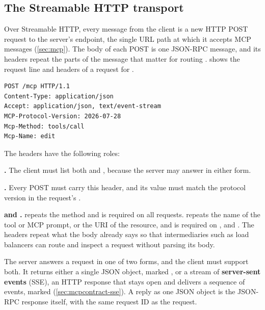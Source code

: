 \subsection{The Streamable HTTP transport}
\label{sec:mcpcontract-http}

Over Streamable HTTP, every message from the client is a new HTTP POST request to the server's
endpoint, the single URL path at which it accepts MCP messages (\cref{sec:mcp}). The body of each
POST is one JSON-RPC message, and its headers repeat the parts of the message that matter for
routing \citep{mcp-spec-2026}.  shows the request line and headers of a
 request for .

\noindent\begin{minipage}{\linewidth}
\begin{lstlisting}[basicstyle=\ttfamily\footnotesize, caption={The request line and headers of a
\texttt{tools/call} request over Streamable HTTP. The body, not shown, is the JSON-RPC request.},
label=lst:mcpcontract-post]
POST /mcp HTTP/1.1
Content-Type: application/json
Accept: application/json, text/event-stream
MCP-Protocol-Version: 2026-07-28
Mcp-Method: tools/call
Mcp-Name: edit
\end{lstlisting}
\end{minipage}

The headers have the following roles:
\bi
\item \textbf{.} The client must list both  and
, because the server may answer in either form.
\item \textbf{.} Every POST must carry this header, and its value must
match the protocol version in the request's .
\item \textbf{ and .}  repeats the method
and is required on all requests.  repeats the name of the tool or MCP prompt, or
the URI of the resource, and is required on ,  and
.
\ei
The headers repeat what the body already says so that intermediaries such as load balancers can
route and inspect a request without parsing its body.

The server answers a request in one of two forms, and the client must support both. It returns
either a single JSON object, marked , or a stream of
\textbf{server-sent events} (SSE), an HTTP response that stays open and delivers a sequence of
events, marked  (\cref{sec:mcpcontract-sse}). A reply as
one JSON object is the JSON-RPC response itself, with the same request ID as the request.

